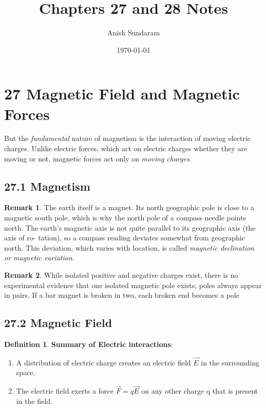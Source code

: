 \documentclass[12pt]{amsart}
\title{Chapters 27 and 28 Notes}
\author{Anish Sundaram}
\date{\today}
\theoremstyle{definition}
\newtheorem{definition}{Definition} %
\newtheorem*{remark}{Remark}        %
\numberwithin{equation}{theorem}    %
\begin{document}
\maketitle

\tableofcontents

\section*{27 Magnetic Field and Magnetic Forces}

But the \textit{fundamental} nature of magnetism is the interaction of moving 
electric charges. Unlike electric forces, which act on electric charges 
whether they are moving or not, magnetic forces act only on \textit{moving charges}.

\subsection*{27.1 Magnetism}

\begin{remark}
    The earth itself is a magnet. Its north geographic pole is close to a magnetic south pole, which is why the north pole of a compass needle points north. The earth’s magnetic axis is not quite parallel to its geographic axis (the axis of ro- tation), so a compass reading deviates somewhat from geographic north. This deviation, which varies with location, is called \textit{magnetic declination or magnetic variation.}
\end{remark}

\begin{remark}
     While isolated positive and negative charges exist, there is no experimental evidence that one isolated magnetic pole exists; poles always appear in pairs. If a bar magnet is broken in two, each broken end becomes a pole 
\end{remark}

\subsection*{27.2 Magnetic Field}

\begin{definition}
    \textbf{Summary of Electric interactions}:
    \begin{enumerate}
        \item A distribution of electric charge creates an electric field $\vec{E}$ in the surrounding space.
        \item The electric field exerts a force $\vec{F} = q\vec{E}$ on any other charge q that is present in the field.
    \end{enumerate}
\end{definition}
\end{document}
